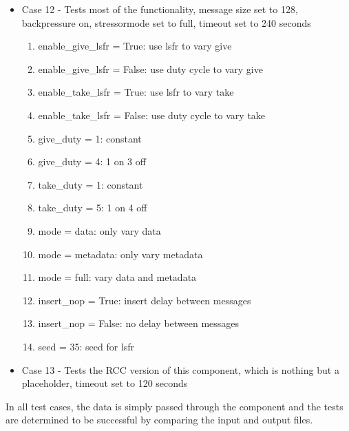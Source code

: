 \documentclass{article}
\begin{document}
\begin{flushleft}
\begin{itemize}
\item Case 12 -  Tests most of the functionality, message size set to 128, backpressure on, stressormode set to full, timeout set to 240 seconds
\begin{enumerate}
	\item enable\_give\_lsfr = True: use lsfr to vary give
	\item enable\_give\_lsfr = False: use duty cycle to vary give
	\item enable\_take\_lsfr = True: use lsfr to vary take
	\item enable\_take\_lsfr = False: use duty cycle to vary take
	\item give\_duty = 1: constant
	\item give\_duty = 4: 1 on 3 off
	\item take\_duty = 1: constant
	\item take\_duty = 5: 1 on 4 off
	\item mode = data: only vary data
	\item mode = metadata: only vary metadata
	\item mode = full: vary data and metadata
	\item insert\_nop = True: insert delay between messages
	\item insert\_nop = False: no delay between messages
	\item seed = 35: seed for lsfr
\end{enumerate}

\item Case 13 - Tests the RCC version of this component, which is nothing but a placeholder, timeout set to 120 seconds
\end{itemize}

In all test cases, the data is simply passed through the component and the tests are determined to be successful by comparing the input and output files.

\end{flushleft}
\end{document}
